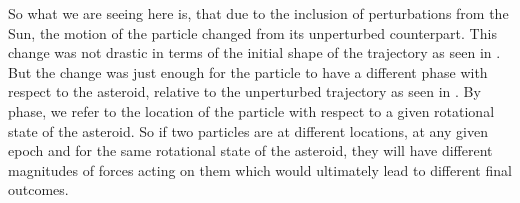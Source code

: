 So what we are seeing here is, that due to the inclusion of perturbations from the Sun, the motion of the particle changed from its unperturbed counterpart. This change was not drastic in terms of the initial shape of the trajectory as seen in . But the change was just enough for the particle to have a different phase with respect to the asteroid, relative to the unperturbed trajectory as seen in . By phase, we refer to the location of the particle with respect to a given rotational state of the asteroid. So if two particles are at different locations, at any given epoch and for the same rotational state of the asteroid, they will have different magnitudes of forces acting on them which would ultimately lead to different final outcomes.

